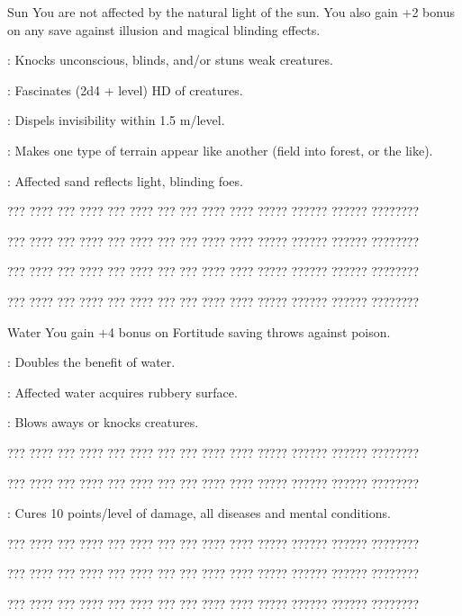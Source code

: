 {Sun}
{You are not affected by the natural light of the sun. You also gain +2 bonus on any save against illusion and magical blinding effects.}
{
	\item {}: Knocks unconscious, blinds, and/or stuns weak creatures.
	\item {}: Fascinates (2d4 + level) HD of creatures.
	\item {}: Dispels invisibility within 1.5 m/level.
	\item {}: Makes one type of terrain appear like another (field into forest, or the like).
	\item {}: Affected sand reflects light, blinding foes.
	\item ??? ???? ??? ???? ??? ???? ??? ??? ???? ???? ????? ?????? ?????? ????????
	\item ??? ???? ??? ???? ??? ???? ??? ??? ???? ???? ????? ?????? ?????? ????????
	\item ??? ???? ??? ???? ??? ???? ??? ??? ???? ???? ????? ?????? ?????? ????????
	\item ??? ???? ??? ???? ??? ???? ??? ??? ???? ???? ????? ?????? ?????? ????????
}

{Water}
{You gain +4 bonus on Fortitude saving throws against poison.}
{
	\item {}: Doubles the benefit of water.
	\item {}: Affected water acquires rubbery surface.
	\item {}: Blows aways or knocks creatures.
	\item ??? ???? ??? ???? ??? ???? ??? ??? ???? ???? ????? ?????? ?????? ????????
	\item ??? ???? ??? ???? ??? ???? ??? ??? ???? ???? ????? ?????? ?????? ????????
	\item {}: Cures 10 points/level of damage, all diseases and mental conditions.
	\item ??? ???? ??? ???? ??? ???? ??? ??? ???? ???? ????? ?????? ?????? ????????
	\item ??? ???? ??? ???? ??? ???? ??? ??? ???? ???? ????? ?????? ?????? ????????
	\item ??? ???? ??? ???? ??? ???? ??? ??? ???? ???? ????? ?????? ?????? ????????
}

